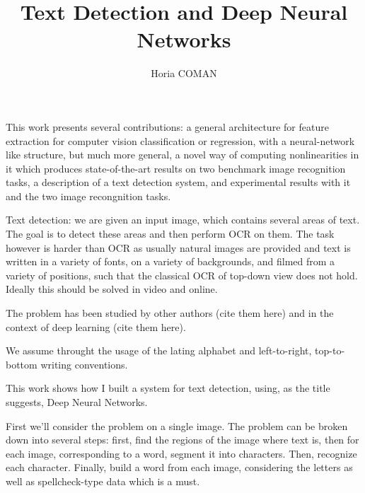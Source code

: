 \documentclass[12pt,a4paper,oneside,english]{UPBThesis}
\begin{document}
\author{Horia COMAN}

\title{Text Detection and Deep Neural Networks}



\beforepreface
\listoffigures
\listoftables
{}
\afterpreface


This work presents several contributions: a general architecture for feature extraction for computer vision classification or regression, with a neural-network like structure, but much more general, a novel way of computing nonlinearities in it which produces state-of-the-art results on two benchmark image recognition tasks, a description of a text detection system, and experimental results with it and the two image recongnition tasks.

Text detection: we are given an input image, which contains several areas of text. The goal is to detect these areas and then perform OCR on them. The task however is harder than OCR as usually natural images are provided and text is written in a variety of fonts, on a variety of backgrounds, and filmed from a variety of positions, such that the classical OCR of top-down view does not hold. Ideally this should be solved in video and online.

The problem has been studied by other authors (cite them here) and in the context of deep learning (cite them here).

We assume throught the usage of the lating alphabet and left-to-right, top-to-bottom writing conventions.

This work shows how I built a system for text detection, using, as the title suggests, Deep Neural Networks.

First we'll consider the problem on a single image. The problem can be broken down into several steps: first, find the regions of the image where text is, then for each image, corresponding to a word, segment it into characters. Then, recognize each character. Finally, build a word from each image, considering the letters as well as spellcheck-type data which is a must.
\end{document}
